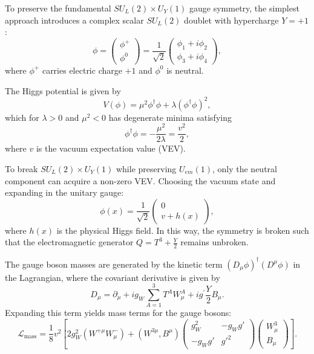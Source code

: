 To preserve the fundamental $SU_L(2) \times U_Y(1)$ gauge symmetry, the simplest approach introduces a complex scalar $SU_L(2)$ doublet with hypercharge $Y = +1$:
\begin{equation}
\phi = \begin{pmatrix} \phi^+ \\ \phi^0 \end{pmatrix} = \frac{1}{\sqrt{2}} \begin{pmatrix} \phi_1 + i\phi_2 \\ \phi_3 + i\phi_4 \end{pmatrix},
\end{equation}
where $\phi^+$ carries electric charge $+1$ and $\phi^0$ is neutral.

The Higgs potential is given by
\begin{equation}
V(\phi) = \mu^2 \phi^\dagger \phi + \lambda(\phi^\dagger \phi)^2,
\end{equation}
which for $\lambda > 0$ and $\mu^2 < 0$ has degenerate minima satisfying
\begin{equation}
\phi^\dagger \phi = -\frac{\mu^2}{2\lambda} = \frac{v^2}{2},
\end{equation}
where $v$ is the vacuum expectation value (VEV).

To break $SU_L(2) \times U_Y(1)$ while preserving $U_{em}(1)$, only the neutral component can acquire a non-zero VEV. Choosing the vacuum state and expanding in the unitary gauge:
\begin{equation}
\phi(x) = \frac{1}{\sqrt{2}} \begin{pmatrix} 0 \\ v + h(x) \end{pmatrix},
\end{equation}
where $h(x)$ is the physical Higgs field. In this way, the symmetry is broken such that the electromagnetic generator $Q = T^3+\frac{Y}{2}$ remains unbroken.

The gauge boson masses are generated by the kinetic term $(D_\mu\phi)^\dagger(D^\mu\phi)$ in the Lagrangian, where the covariant derivative is given by
\begin{equation}
D_\mu = \partial_\mu + ig_W \sum_{A=1}^3 T^A W_\mu^A + ig^\prime \frac{Y}{2}B_\mu.
\end{equation}
Expanding this term yields mass terms for the gauge bosons:
\begin{equation}
\mathcal{L}_{\text{mass}} = \frac{1}{8}v^2 \left[ 2g_W^2(W^{+\mu}W^-_\mu) + (W^{3\mu}, B^\mu) \begin{pmatrix} g_W^2 & -g_Wg' \\ -g_Wg' & g'^2 \end{pmatrix} \begin{pmatrix} W^3_\mu \\ B_\mu \end{pmatrix} \right].
\end{equation}

